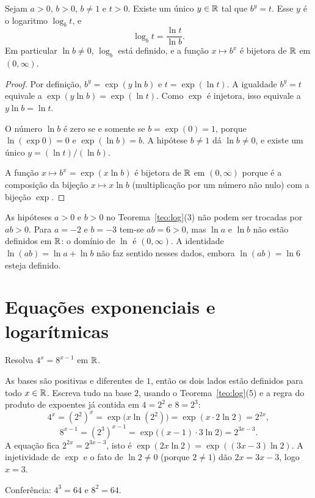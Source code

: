 \documentclass[11pt,a4paper]{article}
\begin{document}
\begin{teorema}\label{teo:mudanca-base}
Sejam $a>0$, $b>0$, $b\neq 1$ e $t>0$. Existe um único $y\in\mathbb{R}$ tal que $b^y=t$. Esse $y$ é o logaritmo $\log_b t$, e
\[
\log_b t=\frac{\ln t}{\ln b}.
\]
Em particular $\ln b\neq 0$, $\log_b$ está definido, e a função $x\mapsto b^x$ é bijetora de $\mathbb{R}$ em $(0,\infty)$.
\end{teorema}

\begin{proof}
Por definição, $b^y=\exp(y\ln b)$ e $t=\exp(\ln t)$. A igualdade $b^y=t$ equivale a $\exp(y\ln b)=\exp(\ln t)$. Como $\exp$ é injetora, isso equivale a $y\ln b=\ln t$.

O número $\ln b$ é zero se e somente se $b=\exp(0)=1$, porque $\ln(\exp 0)=0$ e $\exp(\ln b)=b$. A hipótese $b\neq 1$ dá $\ln b\neq 0$, e existe um único $y=(\ln t)/(\ln b)$.

A função $x\mapsto b^x=\exp(x\ln b)$ é bijetora de $\mathbb{R}$ em $(0,\infty)$ porque é a composição da bijeção $x\mapsto x\ln b$ (multiplicação por um número não nulo) com a bijeção $\exp$.
\end{proof}

\begin{contraexemplo}
As hipóteses $a>0$ e $b>0$ no Teorema~\ref{teo:log}(3) não podem ser trocadas por $ab>0$. Para $a=-2$ e $b=-3$ tem-se $ab=6>0$, mas $\ln a$ e $\ln b$ não estão definidos em $\mathbb{R}$: o domínio de $\ln$ é $(0,\infty)$. A identidade $\ln(ab)=\ln a+\ln b$ não faz sentido nesses dados, embora $\ln(ab)=\ln 6$ esteja definido.
\end{contraexemplo}


\section{Equações exponenciais e logarítmicas}

\begin{exemplo}
Resolva $4^{x}=8^{x-1}$ em $\mathbb{R}$.

As bases são positivas e diferentes de $1$, então os dois lados estão definidos para todo $x\in\mathbb{R}$. Escreva tudo na base $2$, usando o Teorema~\ref{teo:log}(5) e a regra do produto de expoentes já contida em $4=2^2$ e $8=2^3$:
\[
4^{x}=(2^{2})^{x}=\exp\bigl(x\ln(2^{2})\bigr)=\exp(x\cdot 2\ln 2)=2^{2x},
\]
\[
8^{x-1}=(2^{3})^{x-1}=\exp\bigl((x-1)\cdot 3\ln 2\bigr)=2^{3x-3}.
\]
A equação fica $2^{2x}=2^{3x-3}$, isto é $\exp(2x\ln 2)=\exp((3x-3)\ln 2)$. A injetividade de $\exp$ e o fato de $\ln 2\neq 0$ (porque $2\neq 1$) dão $2x=3x-3$, logo $x=3$.

Conferência: $4^{3}=64$ e $8^{2}=64$.
\end{exemplo}
\end{document}

